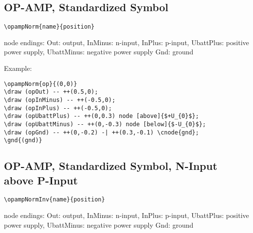 \documentclass[parskip=full]{scrartcl}
\begin{document}
\subsection{OP-AMP, Standardized Symbol}

\begin{verbatim}
\opampNorm{name}{position}
\end{verbatim}
node endings: Out: output, InMinus: n-input, InPlus: p-input,
              UbattPlus: positive power supply,
              UbattMinus: negative power supply
              Gnd: ground

Example:\\
\begin{minipage}{0.8\textwidth}
\begin{verbatim}
\opampNorm{op}{(0,0)}
\draw (opOut) -- ++(0.5,0);
\draw (opInMinus) -- ++(-0.5,0);
\draw (opInPlus) -- ++(-0.5,0);
\draw (opUbattPlus) -- ++(0,0.3) node [above]{$+U_{0}$};
\draw (opUbattMinus) -- ++(0,-0.3) node [below]{$-U_{0}$};
\draw (opGnd) -- ++(0,-0.2) -| ++(0.3,-0.1) \cnode{gnd};
\gnd{(gnd)}
\end{verbatim}
\end{minipage}
\begin{minipage}{0.19\textwidth}
\end{minipage}

\subsection{OP-AMP, Standardized Symbol, N-Input above P-Input}

\begin{verbatim}
\opampNormInv{name}{position}
\end{verbatim}
node endings: Out: output, InMinus: n-input, InPlus: p-input,
              UbattPlus: positive power supply,
              UbattMinus: negative power supply
              Gnd: ground
\end{document}
